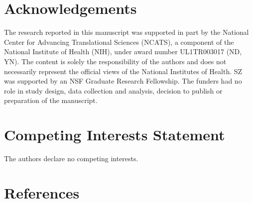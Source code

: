 \documentclass[a4paper,12pt]{article}
\begin{document}
\begin{refsection}[main]
\section*{Acknowledgements}

The research reported in this manuscript was supported in part by the National Center for Advancing Translational Sciences (NCATS), a component of the National Institute of Health (NIH), under award number UL1TR003017 (ND, YN). The content is solely the responsibility of the authors and does not necessarily represent the official views of the National Institutes of Health. SZ was supported by an NSF Graduate Research Fellowship. The funders had no role in study design, data collection and analysis, decision to publish or preparation of the manuscript.

\section*{Competing Interests Statement}

The authors declare no competing interests.

\break
\section*{References}
\printbibliography[heading=main]
\end{refsection}
\end{document}
